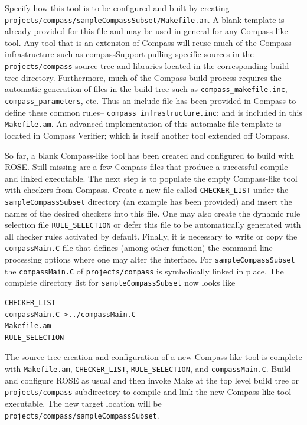 Specify how this tool is to be configured and built by creating
{\tt projects/compass/sampleCompassSubset/Makefile.am}. A blank template
is already provided for this file and may be used in general for any
Compass-like tool. Any tool that is an extension of Compass will reuse much of 
the Compass infrastructure such as compassSupport pulling specific sources in
the {\tt projects/compass} source tree and libraries located in the 
corresponding build tree directory. Furthermore, much of the Compass build
process requires the automatic generation of files in the build tree such
as {\tt compass\_makefile.inc}, {\tt compass\_parameters}, etc. Thus an
include file has been provided in Compass to define these common rules--
{\tt compass\_infrastructure.inc}; and is included in this {\tt Makefile.am}.
An advanced implementation of this automake file template is located in
Compass Verifier; which is itself another tool extended off Compass.

So far, a blank Compass-like tool has been created and configured to build with
ROSE. Still missing are a few Compass files that produce a successful
compile and linked executable. The next step is to populate the empty 
Compass-like tool with checkers from Compass. Create a new file called
{\tt CHECKER\_LIST} under the {\tt sampleCompassSubset} directory (an
example has been provided) and insert the names of the desired checkers into
this file. One may also create the dynamic rule selection file 
{\tt RULE\_SELECTION} or defer this file to be automatically generated with
all checker rules activated by default. Finally, it is necessary to write or
copy the {\tt compassMain.C} file that defines (among other function)
the command line processing options where one may alter the interface. 
For {\tt sampleCompassSubset} the {\tt compassMain.C} of {\tt projects/compass} 
is symbolically linked in place. The complete directory list for 
{\tt sampleCompassSubset} now looks like

\newpage
\begin{verbatim}
CHECKER_LIST
compassMain.C->../compassMain.C
Makefile.am
RULE_SELECTION
\end{verbatim}
%

The source tree creation and configuration of a new Compass-like tool is 
complete with {\tt Makefile.am}, {\tt CHECKER\_LIST}, {\tt RULE\_SELECTION},
and {\tt compassMain.C}. Build and configure ROSE as usual and then invoke
Make at the top level build tree or {\tt projects/compass} subdirectory to
compile and link the new Compass-like tool executable. The new target location
will be {\tt projects/compass/sampleCompassSubset}.
